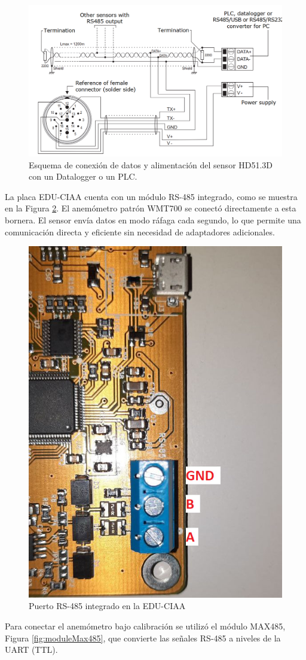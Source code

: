 \begin{figure}[H]
    \centering
    \includegraphics[width=0.9\linewidth]{Figuras/datalogger/Hardware/rs485DeltaOhm.png}
    \caption{Esquema de conexión de datos y alimentación del sensor HD51.3D con un Datalogger o un PLC.}
    \label{fig:rs485DeltaOhm}
\end{figure}
La placa EDU-CIAA cuenta con un módulo RS-485 integrado, como se muestra en la Figura \ref{fig:rs485CIAA}. El anemómetro patrón WMT700 se conectó directamente a esta bornera. El sensor envía datos en modo ráfaga cada segundo, lo que permite una comunicación directa y eficiente sin necesidad de adaptadores adicionales.
\begin{figure}[H]
    \centering
    \includegraphics[width=0.4\linewidth]{Figuras/datalogger/Hardware/rs485CIAA.jpg}
    \caption{Puerto RS-485 integrado en la EDU-CIAA}
    \label{fig:rs485CIAA}
\end{figure}

Para conectar el anemómetro bajo calibración se utilizó el módulo MAX485, Figura \ref{fig:moduleMax485}, que convierte las señales RS-485 a niveles de la UART (TTL). 

